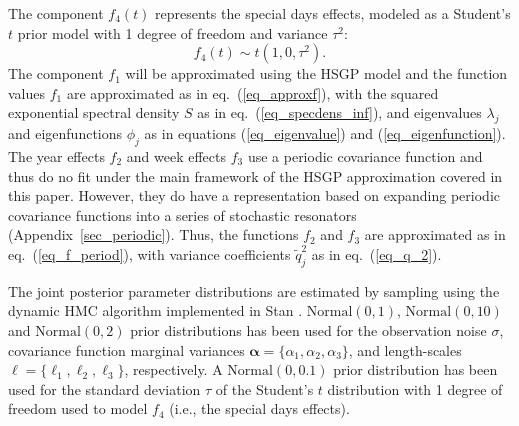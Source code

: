The component $f_4(t)$ represents the special days effects, modeled as a Student's $t$ prior model with 1 degree of freedom and variance $\tau^2$:
%
\begin{equation*}
f_4(t) \sim t(1,0,\tau^2).
\end{equation*}
%
The component $f_1$ will be approximated using the HSGP model and the function values $f_1$ are approximated as in eq.~(\ref{eq_approxf}), with the squared exponential spectral density $S$ as in eq.~(\ref{eq_specdens_inf}), and eigenvalues $\lambda_j$ and eigenfunctions $\phi_j$ as in equations (\ref{eq_eigenvalue}) and (\ref{eq_eigenfunction}). The year effects $f_2$ and week effects $f_3$ use a periodic covariance function  and thus do no fit under the main framework of the HSGP approximation covered in this paper. However, they do have a representation based on expanding periodic covariance functions into a series of stochastic resonators (Appendix~\ref{sec_periodic}). Thus, the functions $f_2$ and $f_3$ are approximated as in eq.~(\ref{eq_f_period}), with variance coefficients $\tilde{q}_j^2$ as in eq.~(\ref{eq_q_2}).

The joint posterior parameter distributions are estimated by sampling using the dynamic HMC algorithm implemented in Stan \citep{StanTeam:2021}. $\mathrm{Normal}(0,1)$, \linebreak $\mathrm{Normal}(0,10)$ and $\mathrm{Normal}(0,2)$ prior distributions has been used for the observation noise $\sigma$, covariance function marginal variances $\bm{\alpha}=\{\alpha_1, \alpha_2, \alpha_3\}$, and length-scales $\bm{\ell}=\{\ell_1, \ell_2, \ell_3\}$, respectively. A $\mathrm{Normal}(0,0.1)$ prior distribution has been used for the standard deviation $\tau$ of the Student's $t$ distribution with 1 degree of freedom used to model $f_4$ (i.e., the special days effects).

